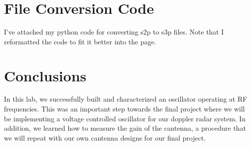 \documentclass{article}
\begin{document}
\section*{File Conversion Code}

I've attached my python code for converting s2p to s3p files. Note that I reformatted the code to fit it better into the page.


\section*{Conclusions}
In this lab, we successfully built and characterized an oscillator operating at RF frequencies. This was an important step towards the final project where we will be implementing a voltage controlled oscillator for our doppler radar system. In addition, we learned how to measure the gain of the cantenna, a procedure that we will repeat with our own cantenna designs for our final project.
\end{document}
